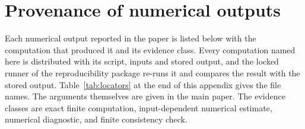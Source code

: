 \section{Provenance of numerical outputs}\label{app:provenance}
Each numerical output reported in the paper is listed below with the
computation that produced it and its evidence class. Every computation named
here is distributed with its script, inputs and stored output, and the
locked runner of the reproducibility package re-runs it and compares the result
with the stored output. Table~\ref{tab:locators} at the end of this appendix
gives the file names. The arguments themselves are given in the main paper.
The evidence classes are exact finite computation, input-dependent numerical
estimate, numerical diagnostic, and finite consistency check.
\par\vspace{0.7em}

